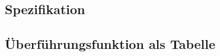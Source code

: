 

\subsection{Spezifikation}

\subsection{Überführungsfunktion als Tabelle}

\clearpage



\clearpage
